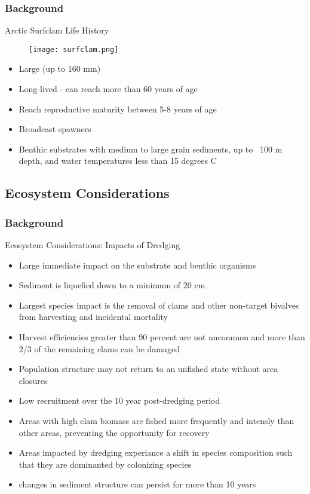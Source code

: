\documentclass{beamer}
\begin{document}
\begin{frame}
\frametitle{Background}
Arctic Surfclam Life History
\begin{figure}
        \begin{center}
            \texttt{[image: surfclam.png]}
        \end{center}
    \end{figure}


\begin{itemize}
\item Large (up to 160 mm)
\item Long-lived - can reach more than 60 years of age
\item Reach reproductive maturity between 5-8 years of age
\item Broadcast spawners
\item Benthic substrates with medium to large grain sediments, up to ~100 m depth, and water temperatures less than 15 degrees C
\end{itemize}

\end{frame}


\subsection{Ecosystem Considerations}

\begin{frame}
\frametitle{Background}
Ecosystem Considerations: Impacts of Dredging
\begin{itemize}
\item Large immediate impact on the substrate and benthic organisms
\item Sediment is liquefied down to a minimum of 20 cm 
\item Largest species impact is the removal of clams and other non-target bivalves from harvesting and incidental mortality
\item Harvest efficiencies greater than 90 percent are not uncommon and more than 2/3 of the remaining clams can be damaged
\item Population structure may not return to an unfished state without area closures
\item Low recruitment over the 10 year post-dredging period
\item Areas with high clam biomass are fished more frequently and intensly than other areas, preventing the opportunity for recovery
\item Areas impacted by dredging experiance a shift in species composition such that they are dominanted by colonizing species
\item changes in sediment structure can persist for more than 10 years
\end{itemize}

\end{frame}
\end{document}
